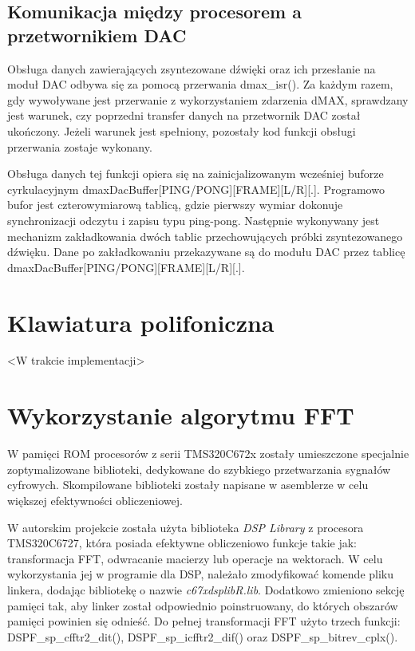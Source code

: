 \subsection{Komunikacja między procesorem a przetwornikiem DAC}
Obsługa danych zawierających zsyntezowane dźwięki oraz ich przesłanie na moduł DAC odbywa się za pomocą przerwania dmax\_isr(). Za każdym razem, gdy wywoływane jest przerwanie z wykorzystaniem zdarzenia dMAX, sprawdzany jest warunek, czy poprzedni transfer danych na przetwornik DAC został ukończony. Jeżeli warunek jest spełniony, pozostały kod funkcji obsługi przerwania zostaje wykonany.

Obsługa danych tej funkcji opiera się na zainicjalizowanym wcześniej buforze cyrkulacyjnym dmaxDacBuffer[PING/PONG][FRAME][L/R][.]. Programowo bufor jest czterowymiarową tablicą, gdzie pierwszy wymiar dokonuje synchronizacji odczytu i zapisu typu ping-pong. Następnie wykonywany jest mechanizm zakładkowania dwóch tablic przechowujących próbki zsyntezowanego dźwięku. Dane po zakładkowaniu przekazywane są do modułu DAC przez tablicę dmaxDacBuffer[PING/PONG][FRAME][L/R][.].

\section{Klawiatura polifoniczna}
<W trakcie implementacji>



\section{Wykorzystanie algorytmu FFT}


W pamięci ROM procesorów z serii TMS320C672x zostały umieszczone specjalnie zoptymalizowane biblioteki, dedykowane do szybkiego przetwarzania sygnałów cyfrowych. Skompilowane biblioteki zostały napisane w asemblerze w celu większej efektywności obliczeniowej. 

W autorskim projekcie została użyta biblioteka \emph{DSP Library} z procesora TMS320C6727, która posiada efektywne obliczeniowo funkcje takie jak: transformacja FFT, odwracanie macierzy lub operacje na wektorach. W celu wykorzystania jej w programie dla DSP, należało zmodyfikować komende pliku linkera, dodając bibliotekę o nazwie \emph{c67xdsplibR.lib}. Dodatkowo zmieniono sekcję pamięci tak, aby linker został odpowiednio poinstruowany, do których obszarów pamięci powinien się odnieść. Do pełnej transformacji FFT użyto trzech funkcji: DSPF\_sp\_cfftr2\_dit(), DSPF\_sp\_icfftr2\_dif() oraz DSPF\_sp\_bitrev\_cplx().

